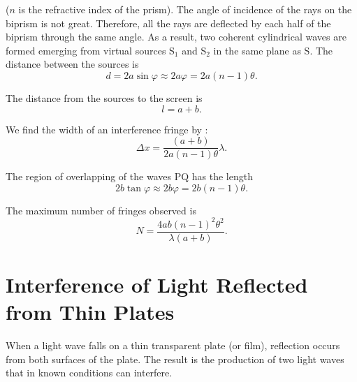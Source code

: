 \noindent
($n$ is the refractive index of the prism).
The angle of incidence of the rays on the biprism is not great.
Therefore, all the rays are deflected by each half of the biprism through the same angle.
As a result, two coherent cylindrical waves are formed emerging from virtual sources S$_1$ and S$_2$ in the same plane as S.
The distance between the sources is
\begin{equation*}
    d = 2a \sin\varphi \approx 2a\varphi = 2a (n - 1) \theta.
\end{equation*}

\noindent
The distance from the sources to the screen is
\begin{equation*}
    l = a + b.
\end{equation*}

We find the width of an interference fringe by :
\begin{equation}\label{eq:17_30}
    \Delta{x} = \frac{(a + b)}{2 a (n - 1) \theta} \lambda.
\end{equation}

\noindent
The region of overlapping of the waves PQ has the length
\begin{equation*}
    2b \tan\varphi \approx 2b\varphi = 2b (n - 1) \theta.
\end{equation*}

\noindent
The maximum number of fringes observed is
\begin{equation}\label{eq:17_31}
    N = \frac{4ab (n-1)^2 \theta^2}{\lambda (a+b)}.
\end{equation}

\section{Interference of Light Reflected from Thin Plates}\label{sec:17_4}

When a light wave falls on a thin transparent plate (or film), reflection occurs from both surfaces of the plate.
The result is the production of two light waves that in known conditions can interfere.


